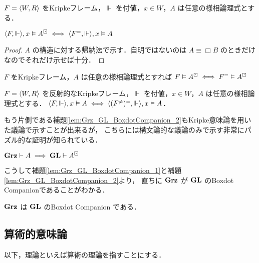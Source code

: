 \documentclass{jlreq}
\begin{document}
\begin{lemma}
	$F = \langle W, R \rangle$ をKripkeフレーム，$\Vdash$ を付値，$x \in W$，$A$ は任意の様相論理式とする．

	$\langle F, \Vdash \rangle, x \vDash A^\boxdot \iff \langle F^{=}, \Vdash \rangle, x \vDash A$
\end{lemma}

\begin{proof}
	$A$ の構造に対する帰納法で示す．自明ではないのは $A \equiv \Box B$ のときだけなのでそれだけ示せば十分．
\end{proof}

\begin{corollary}
	$F$ をKripkeフレーム，$A$ は任意の様相論理式とすれば $F \vDash A^\boxdot \iff F^{=} \vDash A^\boxdot$
\end{corollary}

\begin{lemma}
	$F = \langle W, R \rangle$ を反射的なKripkeフレーム，$\Vdash$ を付値，$x \in W$，$A$ は任意の様相論理式とする．
	$\langle F,\Vdash \rangle, x \vDash A \iff \langle (F^{\neq})^{=}, \Vdash \rangle, x \vDash A$．
\end{lemma}


もう片側である補題\ref{lem:Grz_GL_BoxdotCompanion_2}もKripke意味論を用いた議論で示すことが出来るが，
こちらには構文論的な議論のみで示す非常にパズル的な証明\cite[pp163-164]{boolos_logic_1994}が知られている．

\begin{lemma}\label{lem:Grz_GL_BoxdotCompanion_2}
	$\mathbf{Grz} \vdash A \implies \mathbf{GL} \vdash A^\boxdot$
\end{lemma}


こうして補題\ref{lem:Grz_GL_BoxdotCompanion_1}と補題\ref{lem:Grz_GL_BoxdotCompanion_2}より，
直ちに $\mathbf{Grz}$ が $\mathbf{GL}$ のBoxdot Companionであることがわかる．

\begin{theorem}\label{thm:Grz_GL_BoxdotCompanion}
	$\mathbf{Grz}$ は $\mathbf{GL}$ のBoxdot Companion である．
\end{theorem}




\subsection{算術的意味論}

\begin{remark}
	以下，理論といえば算術の理論を指すことにする．
\end{remark}
\end{document}
